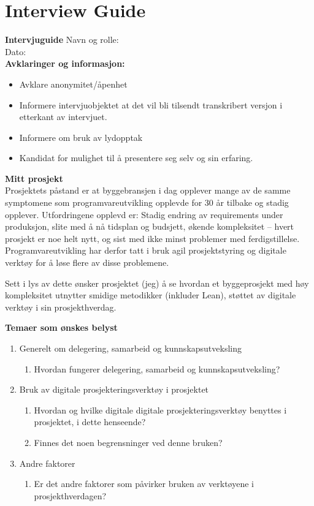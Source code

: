 \chapter{Interview Guide} \label{apx:interview_guide}
\noindent\textbf{Intervjuguide}
Navn og rolle: \\
Dato: \\

\noindent\textbf{Avklaringer og informasjon:} 
\begin{itemize}
    \item Avklare anonymitet/åpenhet
    \item Informere intervjuobjektet at det vil bli tilsendt transkribert versjon i etterkant av intervjuet.
    \item Informere om bruk av lydopptak
    \item Kandidat for mulighet til å presentere seg selv og sin erfaring.
\end{itemize}

\noindent\textbf{Mitt prosjekt} \\
Prosjektets påstand er at byggebransjen i dag opplever mange av de samme symptomene som programvareutvikling opplevde for 30 år tilbake og stadig opplever. Utfordringene opplevd er: Stadig endring av requirements under produksjon, slite med å nå tidsplan og budsjett, økende kompleksitet – hvert prosjekt er noe helt nytt, og sist med ikke minst problemer med ferdigstillelse. Programvareutvikling har derfor tatt i bruk agil prosjektstyring og digitale verktøy for å løse flere av disse problemene.

Sett i lys av dette ønsker prosjektet (jeg) å se hvordan et byggeprosjekt med høy kompleksitet utnytter smidige metodikker (inkluder Lean), støttet av digitale verktøy i sin prosjekthverdag. \\

\pagebreak

\noindent\textbf{Temaer som ønskes belyst}
\begin{enumerate}
    \item Generelt om delegering, samarbeid og kunnskapsutveksling
    \begin{enumerate}
        \item Hvordan fungerer delegering, samarbeid og kunnskapsutveksling?
    \end{enumerate}
    \item Bruk av digitale prosjekteringsverktøy i prosjektet
    \begin{enumerate}
        \item Hvordan og hvilke digitale digitale prosjekteringsverktøy benyttes i\\ prosjektet, i dette henseende?
        \item Finnes det noen begrensninger ved denne bruken?
    \end{enumerate}
    \item Andre faktorer
    \begin{enumerate}
        \item Er det andre faktorer som påvirker bruken av verktøyene i prosjekthverdagen?
    \end{enumerate}
\end{enumerate}